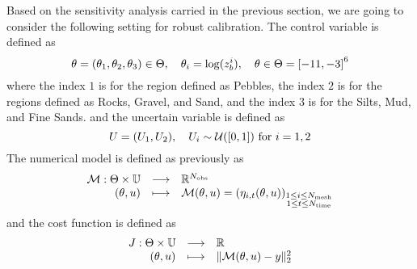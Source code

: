 \documentclass[../../Main_ManuscritThese.tex]{subfiles}
\newcommand{\zob}{z_b}
\begin{document}
Based on the sensitivity analysis carried in the previous section, we
are going to consider the following setting for robust calibration.
The control variable is defined as
\begin{equation}
  \kk=\left(\kk_1,\kk_2,\kk_3\right) \in \Kspace, \quad \kk_i = \log(\zob^i), \quad \KK \in \Kspace = \interval{-11}{-3}^6
  \end{equation}
  where the index $1$ is for the region defined as Pebbles, the index
  $2$ is for the regions defined as Rocks, Gravel, and Sand, and the
  index $3$ is for the Silts, Mud, and Fine Sands.  and the uncertain
  variable is defined as
\begin{equation}
  \UU = (\UU_1,\UU_2), \quad \UU_i \sim \mathcal{U}(\interval{0}{1}) \text{ for } i=1,2
\end{equation}
The numerical model is defined as previously as
\begin{equation}
  \begin{array}{rcl}
    \mathcal{M}: \Theta \times \mathbb{U} &\longrightarrow& \mathbb{R}^{N_{\mathrm{obs}}} \\
    (\theta, u)& \longmapsto & \mathcal{M}(\theta, u) = \left(\eta_{i,t}(\theta, u)\right)_{\substack{1 \leq i \leq N_{\mathrm{mesh}} \\ 1 \leq t \leq N_{\mathrm{time}}}} \\ 
  \end{array}
\end{equation}
and the cost function is defined as
\begin{equation}
  \begin{array}{rcl}
    J: \Theta \times \mathbb{U} & \longrightarrow & \mathbb{R} \\
    (\theta, u) & \longmapsto & \|\mathcal{M}(\theta, u) - y \|^2_2
  \end{array}
\end{equation}
\end{document}
